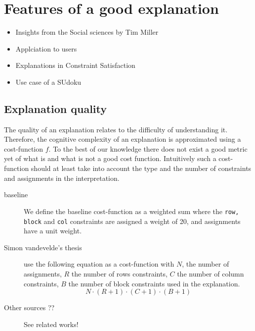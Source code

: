 \documentclass[a4paper,UKenglish,cleveref, autoref, cleveref, thm-restate,pdfa]{lipics-v2021}
\begin{document}
	
	\section{Features of a good explanation}
	
	\begin{itemize}
		\item Insights from the Social sciences by Tim Miller 
		\item Applciation to users
		\item Explanations in Constraint Satisfaction
		\item Use case of a SUdoku
	\end{itemize}		
	
	\subsection{Explanation quality} The quality of an explanation relates to the difficulty of understanding it. Therefore, the cognitive complexity of an explanation is approximated using a cost-function $f$. To the best of our knowledge there does not exist a good metric yet of what is and what is not a good cost function. Intuitively such a cost-function should at least take into account the type and the number of constraints and assignments in the interpretation.
	
	\begin{description}
		\item[baseline] We define the baseline cost-function as a weighted sum where the \texttt{row, block} and \texttt{col} constraints are assigned a weight of 20, and assignments have a unit weight.
		\item[Simon vandevelde's thesis\cite{master-thesis-sudoku}] use the following equation as a cost-function with $N$, the number of assignments, $R$ the number of rows constraints, $C$ the number of column constraints, $B$ the number of block constraints used in the explanation.
		\begin{equation}
			N \cdot (R + 1) \cdot (C + 1) \cdot (B + 1) 
		\end{equation} 
	\item[Other sources ??] See related works!
	\end{description}
\end{document}
